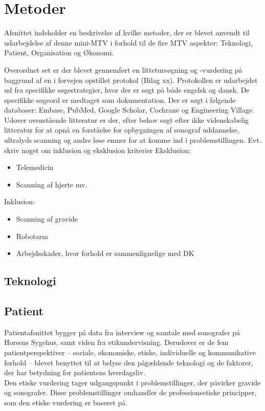 \chapter{Metoder}
Afsnittet indeholder en beskrivelse af hvilke metoder, der er blevet anvendt til udarbejdelse af denne mini-MTV i forhold til de fire MTV aspekter: Teknologi, Patient, Organisation og Økonomi.

Overordnet set er der blevet gennemført en littetursøgning og -vurdering på baggrund af en i forvejen opstillet protokol (Bilag xx). Protokollen er udarbejdet ud fra specifikke søgestrategier, hvor der er søgt på både engelsk og dansk. De specifikke søgeord er medtaget som dokumentation. Der er søgt i følgende databaser: Embase, PubMed, Google Scholar, Cochrane og Engineering Village. \\
Udover ovenstående litteratur er der, efter behov søgt efter ikke videnskabelig litteratur for at opnå en forståelse for opbygningen af sonograf uddannelse, ultralyds scanning og andre løse emner for at komme ind i problemstillingen. 
Evt. skriv noget om inklusion og eksklusion kriterier
Eksklusion:
\begin{itemize}
\item Telemedicin
\item Scanning af hjerte mv.
\end{itemize}
Inklusion:
\begin{itemize}
\item Scanning af gravide
\item Robotarm
\item Arbejdsskader, hvor forhold er sammenlignelige med DK
\end{itemize}

\section{Teknologi}
\section{Patient}
Patientafsnittet bygger på data fra interview og samtale med sonografer på Horsens Sygehus, samt viden fra etikundervisning. Derudover er de fem patientperspektiver – sociale, økonomiske, etiske, individuelle og kommunikative forhold – blevet benyttet til at belyse den pågældende teknologi og de faktorer, der har betydning for patientens hverdagsliv.\\ 
Den etiske vurdering tager udgangspunkt i problemstillinger, der påvirker gravide og sonografer. Disse problemstillinger omhandler de professionsetiske principper, som den etiske vurdering er baseret på.
